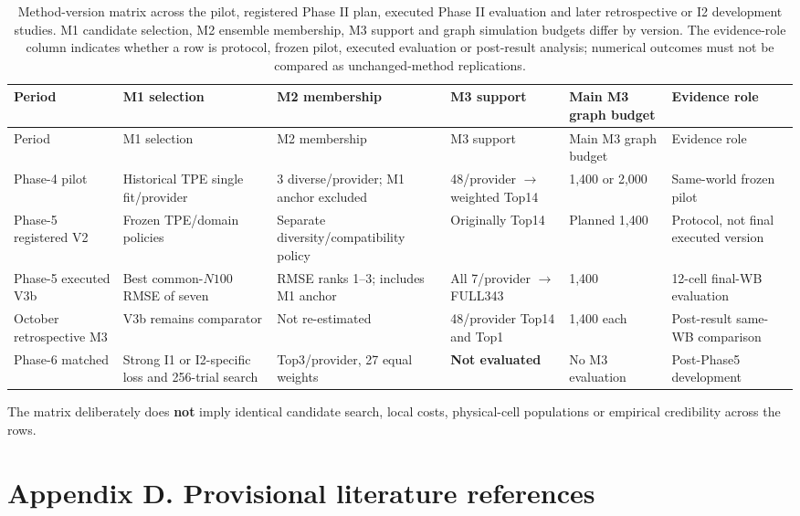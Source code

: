 \documentclass[10pt,a4paper]{article}
\begin{document}
\begingroup
\footnotesize
\setlength{\tabcolsep}{3pt}
\begin{longtable}{@{}L{0.1500\textwidth}L{0.1500\textwidth}L{0.1500\textwidth}L{0.1500\textwidth}L{0.1500\textwidth}L{0.1500\textwidth}@{}}
\caption{Method-version matrix across the pilot, registered Phase II plan, executed Phase II evaluation and later retrospective or I2 development studies. M1 candidate selection, M2 ensemble membership, M3 support and graph simulation budgets differ by version. The evidence-role column indicates whether a row is protocol, frozen pilot, executed evaluation or post-result analysis; numerical outcomes must not be compared as unchanged-method replications.}\label{tab:method-versions}\\
\toprule
Period & M1 selection & M2 membership & M3 support & Main M3 graph budget & Evidence role \\
\midrule
\endfirsthead
\toprule
Period & M1 selection & M2 membership & M3 support & Main M3 graph budget & Evidence role \\
\midrule
\endhead
Phase-4 pilot & Historical TPE single fit/provider & 3 diverse/provider; M1 anchor excluded & 48/provider $\to$ weighted Top14 & 1,400 or 2,000 & Same-world frozen pilot \\
Phase-5 registered V2 & Frozen TPE/domain policies & Separate diversity/compatibility policy & Originally Top14 & Planned 1,400 & Protocol, not final executed version \\
Phase-5 executed V3b & Best common-$N100$ RMSE of seven & RMSE ranks 1–3; includes M1 anchor & All 7/provider $\to$ FULL343 & 1,400 & 12-cell final-WB evaluation \\
October retrospective M3 & V3b remains comparator & Not re-estimated & 48/provider Top14 and Top1 & 1,400 each & Post-result same-WB comparison \\
Phase-6 matched & Strong I1 or I2-specific loss and 256-trial search & Top3/provider, 27 equal weights & \textbf{Not evaluated} & No M3 evaluation & Post-Phase5 development \\
\bottomrule
\end{longtable}
\endgroup

The matrix deliberately does \textbf{not} imply identical candidate search, local costs, physical-cell populations or empirical credibility across the rows.

\section*{Appendix D. Provisional literature references}
\end{document}
